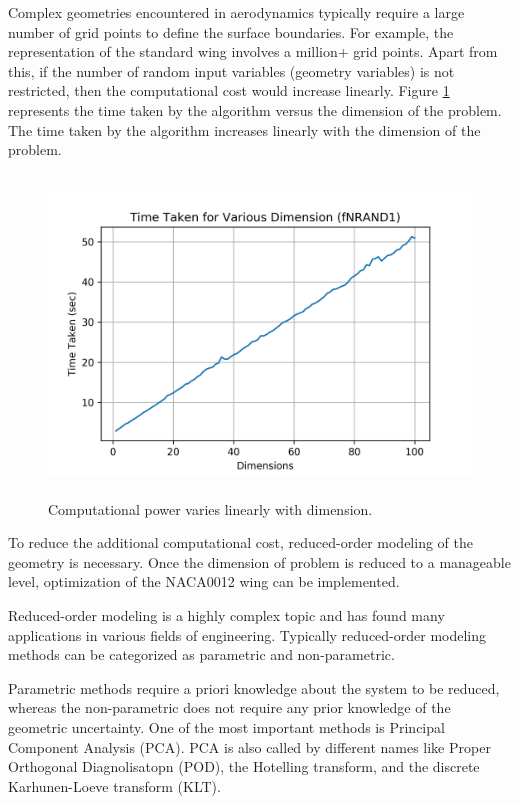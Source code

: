 Complex geometries encountered in aerodynamics typically require a large number of grid points to define the surface boundaries. For example, the representation of the standard wing involves a million+ grid points. Apart from this, if the number of random input variables (geometry variables) is not restricted, then the computational cost would increase linearly. Figure \ref{comp_power} represents the time taken by the algorithm versus the dimension of the problem. The time taken by the algorithm increases linearly with the dimension of the problem.

\begin{figure}[!htbp]
    \centering
    \includegraphics[width = \textwidth, height=85mm]{figures/plot_dimension_time_taken.png}
    \caption{Computational power varies linearly with dimension.}
    \label{comp_power}
\end{figure}

To reduce the additional computational cost, reduced-order modeling of the geometry is necessary. Once the dimension of problem is reduced to a manageable level, optimization of the NACA0012 wing can be implemented.

Reduced-order modeling is a highly complex topic and has found many applications in various fields of engineering. Typically reduced-order modeling methods can be categorized as parametric and non-parametric.

Parametric methods require a priori knowledge about the system to be reduced, whereas the non-parametric does not require any prior knowledge of the geometric uncertainty. One of the most important methods is Principal Component Analysis (PCA). PCA is also called by different names like Proper Orthogonal Diagnolisatopn (POD), the Hotelling transform, and the discrete Karhunen-Loeve transform (KLT).

